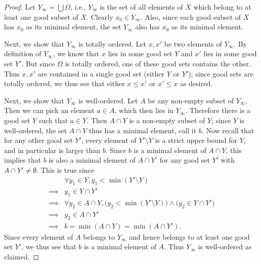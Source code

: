 \begin{proof}
  Let \(Y_{\infty} = \bigcup \Omega\), i.e., \(Y_{\infty}\) is the set of all elements of \(X\) which belong to at least one good subset of \(X\).
  Clearly \(x_0 \in Y_{\infty}\).
  Also, since each good subset of \(X\) has \(x_0\) as its minimal element, the set \(Y_{\infty}\) also has \(x_0\) as its minimal element.

  Next, we show that \(Y_{\infty}\) is totally ordered.
  Let \(x, x'\) be two elements of \(Y_{\infty}\).
  By definition of \(Y_{\infty}\), we know that \(x\) lies in some good set \(Y\) and \(x'\) lies in some good set \(Y'\).
  But since \(\Omega\) is totally ordered, one of these good sets contains the other.
  Thus \(x, x'\) are contained in a single good set (either \(Y\) or \(Y'\));
  since good sets are totally ordered, we thus see that either \(x \leq x'\) or \(x' \leq x\) as desired.

  Next, we show that \(Y_{\infty}\) is well-ordered.
  Let \(A\) be any non-empty subset of \(Y_{\infty}\).
  Then we can pick an element \(a \in A\), which then lies in \(Y_{\infty}\).
  Therefore there is a good set \(Y\) such that \(a \in Y\).
  Then \(A \cap Y\) is a non-empty subset of \(Y\);
  since \(Y\) is well-ordered, the set \(A \cap Y\) thus has a minimal element, call it \(b\).
  Now recall that for any other good set \(Y'\), every element of \(Y' \setminus Y\) is a strict upper bound for \(Y\), and in particular is larger than \(b\).
  Since \(b\) is a minimal element of \(A \cap Y\), this implies that \(b\) is also a minimal element of \(A \cap Y'\) for any good set \(Y'\) with \(A \cap Y' \neq \emptyset\).
  This is true since
  \begin{align*}
             & \forall y_1 \in Y, y_1 < \min(Y' \setminus Y)                                                    \\
    \implies & y_1 \in Y \cap Y'                                                                                \\
    \implies & \forall y_2 \in A \cap Y, \big(y_2 < \min(Y' \setminus Y)\big) \land \big(y_2 \in Y \cap Y'\big) \\
    \implies & y_2 \in A \cap Y'                                                                                \\
    \implies & b = \min(A \cap Y) = \min(A \cap Y').
  \end{align*}
  Since every element of \(A\) belongs to \(Y_{\infty}\) and hence belongs to at least one good set \(Y'\), we thus see that \(b\) is a minimal element of \(A\).
  Thus \(Y_{\infty}\) is well-ordered as claimed.


\end{proof}
